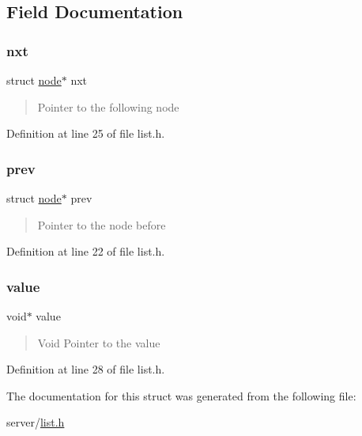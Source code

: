 \subsection{Field Documentation}
\mbox{\label{structnode_a745e59ece59d43566f37915138c7aee3}} 
\subsubsection{\texorpdfstring{nxt}{nxt}}
{\footnotesize\ttfamily struct \hyperlink{structnode}{node}$\ast$ nxt}



\begin{quote}
Pointer to the following node \end{quote}




Definition at line 25 of file list.\+h.

\mbox{\label{structnode_a530843171ca1a6e033bac999737cb184}} 
\subsubsection{\texorpdfstring{prev}{prev}}
{\footnotesize\ttfamily struct \hyperlink{structnode}{node}$\ast$ prev}



\begin{quote}
Pointer to the node before \end{quote}




Definition at line 22 of file list.\+h.

\mbox{\label{structnode_a0f61d63b009d0880a89c843bd50d8d76}} 
\subsubsection{\texorpdfstring{value}{value}}
{\footnotesize\ttfamily void$\ast$ value}



\begin{quote}
Void Pointer to the value \end{quote}




Definition at line 28 of file list.\+h.



The documentation for this struct was generated from the following file\+:\begin{DoxyCompactItemize}
\item 
server/\hyperlink{list_8h}{list.\+h}\end{DoxyCompactItemize}
